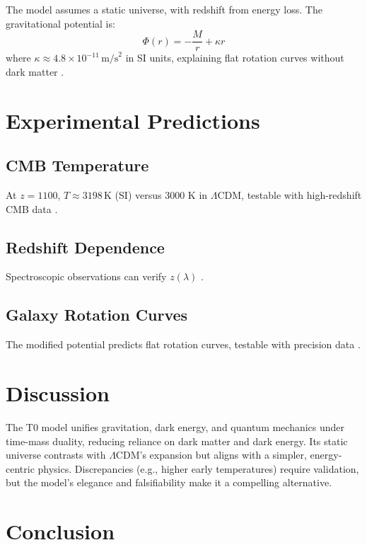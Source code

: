 \documentclass[12pt,a4paper]{article}
\begin{document}
	The model assumes a static universe, with redshift from energy loss. The gravitational potential is:
	\begin{equation}
		\Phi(r) = -\frac{M}{r} + \kappa r
	\end{equation}
	where \(\kappa \approx 4.8 \times 10^{-11} \, \text{m/s}^2\) in SI units, explaining flat rotation curves without dark matter \cite{pascher_galaxies_2025}.
	
	\section{Experimental Predictions}
	
	\subsection{CMB Temperature}
	
	At \(z = 1100\), \(T \approx 3198 \, \text{K}\) (SI) versus 3000 K in \(\Lambda\)CDM, testable with high-redshift CMB data \cite{pascher_temp_2025}.
	
	\subsection{Redshift Dependence}
	
	Spectroscopic observations can verify \(z(\lambda)\) \cite{pascher_photons_2025}.
	
	\subsection{Galaxy Rotation Curves}
	
	The modified potential predicts flat rotation curves, testable with precision data \cite{pascher_galaxies_2025}.
	
	\section{Discussion}
	
	The T0 model unifies gravitation, dark energy, and quantum mechanics under time-mass duality, reducing reliance on dark matter and dark energy. Its static universe contrasts with \(\Lambda\)CDM’s expansion but aligns with a simpler, energy-centric physics. Discrepancies (e.g., higher early temperatures) require validation, but the model’s elegance and falsifiability make it a compelling alternative.
	
	\section{Conclusion}
	
\end{document}
